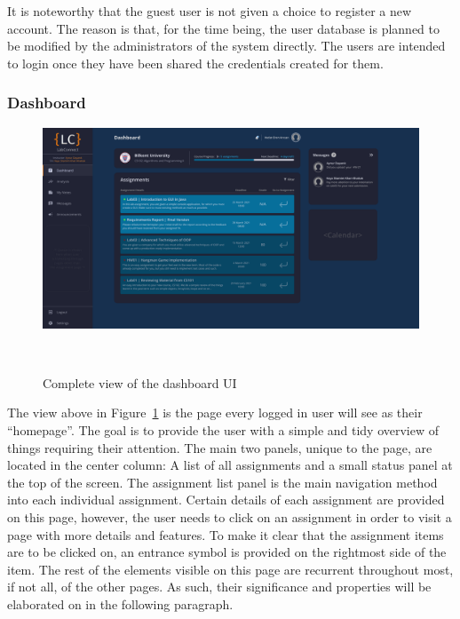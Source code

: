 \documentclass[a4paper, 12pt]{article}
\begin{document}
    It is noteworthy that the guest user is not given a choice to register a new account.
    The reason is that, for the time being, the user database is planned to be modified by the administrators of the system directly.
    The users are intended to login once they have been shared the credentials created for them.
    
    \pagebreak
    
    \subsubsection{Dashboard}
    
    \begin{figure}[H]
        \centering
        \includegraphics[width=\textwidth]{main_dashboard}
        \caption{Complete view of the dashboard UI}~\label{fig:dashboard_full}
    \end{figure}
    
    The view above in Figure~\ref{fig:dashboard_full} is the page every logged in user will see as their ``homepage''.
    The goal is to provide the user with a simple and tidy overview of things requiring their attention.
    The main two panels, unique to the page, are located in the center column: A list of all assignments and a small
    status panel at the top of the screen. The assignment list panel is the main navigation method into each individual
    assignment. Certain details of each assignment are provided on this page, however, the user needs to click on an
    assignment in order to visit a page with more details and features. To make it clear that the assignment items are
    to be clicked on, an entrance symbol is provided on the rightmost side of the item.
    The rest of the elements visible on this page are recurrent throughout most, if not all, of the other pages.
    As such, their significance and properties will be elaborated on in the following paragraph.
    
\end{document}
